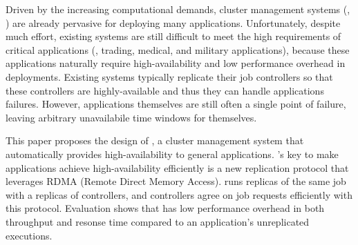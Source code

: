 
Driven by the increasing computational demands, cluster management systems 
(\eg, \mesos) are already pervasive for deploying many applications. 
Unfortunately, despite much effort, existing systems are still difficult to 
meet the high requirements of critical applications (\eg, trading, medical, and 
military applications), because these applications naturally require 
high-availability and low performance overhead in deployments. Existing systems 
typically replicate their job controllers so that these controllers are 
highly-available and thus they can handle applications failures. However, 
applications themselves are still often a single point of failure, leaving 
arbitrary unavailabile time windows for themselves.


This paper proposes the design of \xxx, a cluster management system that 
automatically provides high-availability to general applications. \xxx's key to 
make applications achieve high-availability efficiently is a new \paxos 
replication protocol that leverages RDMA (Remote Direct Memory Access). \xxx 
runs replicas of the same job with a replicas of controllers, and 
controllers agree on job requests efficiently with this protocol.
Evaluation shows that \xxx has low performance overhead in 
both throughput and resonse time compared to an application's 
unreplicated executions.


